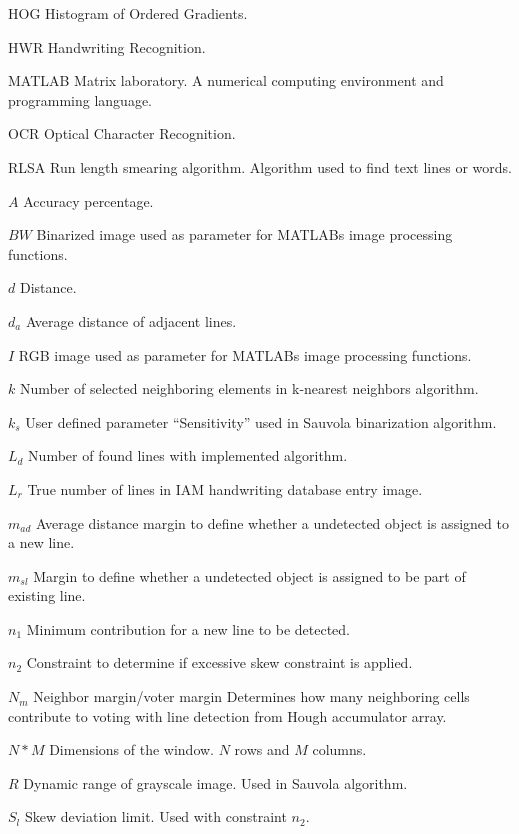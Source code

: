 \documentclass{article}
\begin{document}
   \begin{abbrv}
    \item[HOG] Histogram of Ordered Gradients.
    \item[HWR] Handwriting Recognition.
    \item[MATLAB] Matrix laboratory. A numerical computing environment and programming language.
    \item[OCR] Optical Character Recognition.
    \item[RLSA] Run length smearing algorithm. Algorithm used to find text lines or words.

    \item[$A$] Accuracy percentage.
    \item[$BW$] Binarized image used as parameter for MATLABs image processing functions.
    \item[$d$] Distance.
    \item[$d_a$] Average distance of adjacent lines.
    \item[$I$] RGB image used as parameter for MATLABs image processing functions.
    \item[$k$] Number of selected neighboring elements in k-nearest neighbors algorithm.
    \item[$k_s$] User defined parameter ``Sensitivity'' used in Sauvola binarization algorithm.
    \item[$L_d$] Number of found lines with implemented algorithm.
    \item[$L_r$] True number of lines in IAM handwriting database entry image.
    \item[$m_{ad}$] Average distance margin to define whether a undetected object is assigned to a new line.
    \item[$m_{sl}$] Margin to define whether a undetected object is assigned to be part of existing line.
    \item[$n_1$] Minimum contribution for a new line to be detected.
    \item[$n_2$] Constraint to determine if excessive skew constraint is applied.
    \item[$N_m$] Neighbor margin/voter margin Determines how many neighboring cells contribute to voting with line detection from Hough accumulator array.
    \item[$N * M$] Dimensions of the window. $N$ rows and $M$ columns.
    \item[$R$] Dynamic range of grayscale image. Used in Sauvola algorithm.
    \item[$S_l$] Skew deviation limit. Used with constraint $n_2$.

\end{abbrv}
\end{document}
